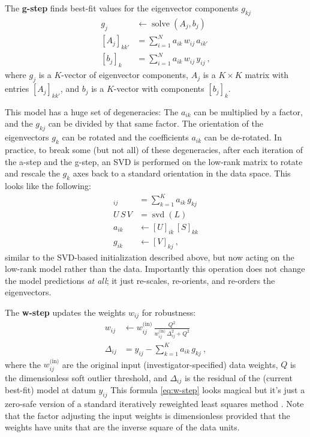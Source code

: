 \documentclass{article}
\DeclareMathOperator{\solve}{solve}
\DeclareMathOperator{\svd}{svd}
\begin{document}
The \textbf{g-step} finds best-fit values for the eigenvector components $g_{kj}$
\begin{align}
    g_j &\leftarrow \solve(A_j, b_j) \\ \label{eq:g-step}
    [A_j]_{kk'} &= \sum_{i=1}^N a_{ik}\,w_{ij}\,a_{ik'} \\
    [b_j]_k     &= \sum_{i=1}^N a_{ik}\,w_{ij}\,y_{ij} ~,
\end{align}
where $g_j$ is a $K$-vector of eigenvector components,
$A_j$ is a $K\times K$ matrix with entries $[A_j]_{kk'}$,
and $b_j$ is a $K$-vector with components $[b_j]_k$.

This model has a huge set of degeneracies:
The $a_{ik}$ can be multiplied by a factor, and the $g_{kj}$ can be divided by that same factor.
The orientation of the eigenvectors $g_k$ can be rotated and the coefficients $a_{ik}$ can be de-rotated.
In practice, to break some (but not all) of these degeneracies, after each iteration of the a-step and the g-step,
an SVD is performed on the low-rank matrix
to rotate and rescale the $g_k$ axes back to a standard orientation in the data space.
This looks like the following:
\begin{align}
    [L]_{ij} &= \sum_{k=1}^K a_{ik}\,g_{kj} \\
    U\,S\,V &= \svd(L) \\
    a_{ik} &\leftarrow [U]_{ik}\,[S]_{kk} \\
    g_{ik} &\leftarrow [V]_{kj} ~,
\end{align}
similar to the SVD-based initialization described above, but now acting on the low-rank model rather than the data.
Importantly this operation does not change the model predictions \emph{at all}; it just re-scales, re-orients, and re-orders the eigenvectors.

The \textbf{w-step} updates the weights $w_{ij}$ for robustness:
\begin{align}
    w_{ij} &\leftarrow w^\text{(in)}_{ij}\,\frac{Q^2}{w^\text{(in)}_{ij}\,\Delta_{ij}^2 + Q^2} \\ \label{eq:w-step}
    \Delta_{ij} &= y_{ij} - \sum_{k=1}^K a_{ik}\,g_{kj} ~,
\end{align}
where the $w^\text{(in)}_{ij}$ are the original input (investigator-specified) data weights,
$Q$ is the dimensionless soft outlier threshold,
and $\Delta_{ij}$ is the residual of the (current best-fit) model at datum $y_{ij}$
This formula \eqref{eq:w-step} looks magical but it's just a zero-safe version of a standard iteratively reweighted least squares method \cite{irls}.
Note that the factor adjusting the input weights is dimensionless provided that the weights have units that are the inverse square of the data units.
\end{document}
